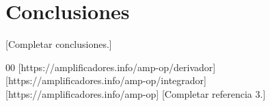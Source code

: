 \documentclass[conference]{IEEEtran}
\begin{document}
\section{Conclusiones}
[Completar conclusiones.]

\begin{thebibliography}{00}
 [https://amplificadores.info/amp-op/derivador]
 [https://amplificadores.info/amp-op/integrador]
 [https://amplificadores.info/amp-op]
 [Completar referencia 3.]
\end{thebibliography}
\end{document}
